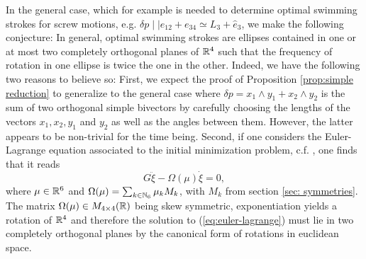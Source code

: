 In the general case, which for example is needed to determine optimal swimming strokes for screw motions, e.g. $\delta p \mid \mid e_{12} + e_{34} \simeq L_3 + \hat{e}_3$, we make the following conjecture: In general, optimal swimming strokes are ellipses contained in one or at most two completely orthogonal planes of $\mathbb{R}^4$ such that the frequency of rotation in one ellipse is twice the one in the other. Indeed, we have the following two reasons to believe so: First, we expect the proof of Proposition \ref{prop:simple reduction} to generalize to the general case where $\delta p = x_1 \wedge y_1 + x_2 \wedge y_2$ is the sum of two orthogonal simple bivectors by carefully choosing the lengths of the vectors $x_1, x_2, y_1$ and $y_2$ as well as the angles between them. However, the latter appears to be non-trivial for the time being. Second, if one considers the Euler-Lagrange equation associated to the initial minimization problem, c.f. \cite{DeSimone2011}, one finds that it reads
\begin{equation}
\label{eq:euler-lagrange}
G \ddot{\xi} - \Omega(\mu) \dot{\xi} = 0,
\end{equation}
where $\mu \in \mathbb{R}^6$ and $\Omega(\mu) = \sum_{k \in \mathbb{N}_6} \mu_k M_k$, with $M_k$ from section \ref{sec: symmetries}. The matrix $\Omega(\mu) \in M_{4 \times 4}(\mathbb{R})$ being skew symmetric, exponentiation yields a rotation of $\mathbb{R}^4$ and therefore the solution to (\ref{eq:euler-lagrange}) must lie in two completely orthogonal planes by the canonical form of rotations in euclidean space.
